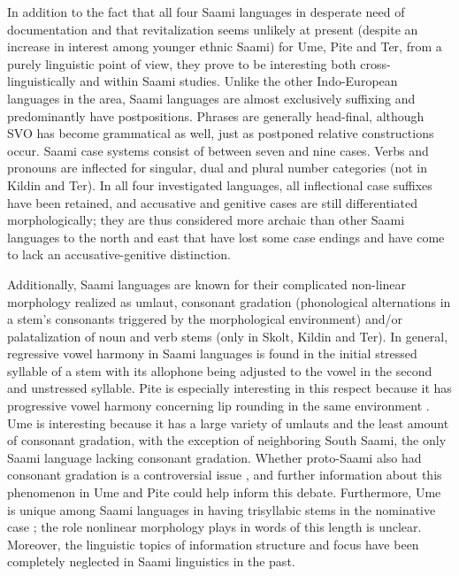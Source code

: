\documentclass[a4paper,12pt]{article}
\begin{document}
In addition to the fact that all four Saami languages in desperate need of documentation and that revitalization seems unlikely at present (despite an increase in interest among younger ethnic Saami) for Ume, Pite and Ter, from a purely linguistic point of view, they prove to be interesting both cross-linguistically and within Saami studies. Unlike the other Indo-European languages in the area, Saami languages are almost exclusively suffixing and predominantly have postpositions. Phrases are generally head-final, although SVO has become grammatical as well, just as postponed relative constructions occur. Saami case systems consist of between seven and nine cases. Verbs and pronouns are inflected for singular, dual and plural number categories (not in Kildin and Ter). In all four investigated languages, all inflectional case suffixes have been retained, and accusative and genitive cases are still differentiated morphologically; they are thus considered more archaic than other Saami languages to the north and east that have lost some case endings and have come to lack an accusative-genitive distinction. %

Additionally, Saami languages are known for their complicated non-linear morphology realized as umlaut, consonant gradation (phonological alternations in a stem's consonants triggered by the morphological environment) and/or palatalization of noun and verb stems (only in Skolt, Kildin and Ter). In general, regressive vowel harmony in Saami languages is found in the initial stressed syllable of a stem with its allophone being adjusted to the vowel in the second and unstressed syllable. Pite is especially interesting in this respect because it has progressive vowel harmony concerning lip rounding in the same environment \cite[272]{korhonen2005a}. Ume is interesting because it has a large variety of umlauts and the least amount of consonant gradation, with the exception of neighboring South Saami, the only Saami language lacking consonant gradation. Whether proto-Saami also had consonant gradation is a controversial issue \cite[cf.][154–55]{svonni2006}, and further information about this phenomenon in Ume and Pite could help inform this debate. Furthermore, Ume is unique among Saami languages in having trisyllabic stems in the nominative case \cite[421]{korhonen2005b}; the role nonlinear morphology plays in words of this length is unclear. Moreover, the linguistic topics of information structure and focus have been completely neglected in Saami linguistics in the past.
\end{document}
